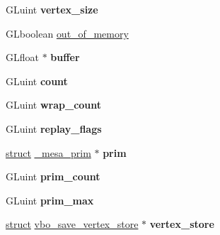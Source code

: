 \begin{DoxyCompactItemize}
\item 
\mbox{\label{structvbo__save__context_a1d055192da7f61ee8ff8754d5b2c6d92}} 
G\+Luint {\bfseries vertex\+\_\+size}
\item 
G\+Lboolean \hyperlink{structvbo__save__context_ab57d574dd52495859511714c6fdc9ff2}{out\+\_\+of\+\_\+memory}
\item 
\mbox{\label{structvbo__save__context_af67fb71d973f6cb306888809843d8f72}} 
G\+Lfloat $\ast$ {\bfseries buffer}
\item 
\mbox{\label{structvbo__save__context_a7af65770cff325819bcf8848c78702b6}} 
G\+Luint {\bfseries count}
\item 
\mbox{\label{structvbo__save__context_a5d4835c82ae98be5112e3294923fb69f}} 
G\+Luint {\bfseries wrap\+\_\+count}
\item 
\mbox{\label{structvbo__save__context_ac1b69ad8c2528d1a598151d0eb638c63}} 
G\+Luint {\bfseries replay\+\_\+flags}
\item 
\mbox{\label{structvbo__save__context_aa80e34cb5fbc93e0ba742f2e367ce0a1}} 
\hyperlink{interfacestruct}{struct} \hyperlink{struct__mesa__prim}{\+\_\+mesa\+\_\+prim} $\ast$ {\bfseries prim}
\item 
\mbox{\label{structvbo__save__context_ab2df3c37a16078116b764abc46d4c1b5}} 
G\+Luint {\bfseries prim\+\_\+count}
\item 
\mbox{\label{structvbo__save__context_aa1a1ea1a07c40dad6be795772430157c}} 
G\+Luint {\bfseries prim\+\_\+max}
\item 
\mbox{\label{structvbo__save__context_a81cb77114775a1ea3e4a4959599af6b0}} 
\hyperlink{interfacestruct}{struct} \hyperlink{structvbo__save__vertex__store}{vbo\+\_\+save\+\_\+vertex\+\_\+store} $\ast$ {\bfseries vertex\+\_\+store}
\item 
\mbox{\label{structvbo__save__context_ae6a43be8b1ea26261d81ad0cb71acaeb}} 

\end{DoxyCompactItemize}
